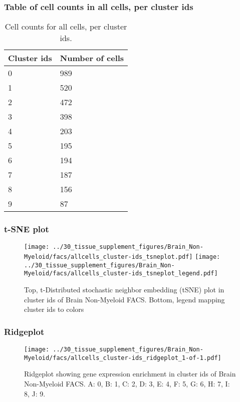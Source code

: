 \subsubsection{Table of cell counts in all cells, per cluster ids}\begin{table}[h]
\centering
\label{my-label}
\begin{tabular}{@{}ll@{}}
\toprule

Cluster ids& Number of cells \\ \midrule
0 & 989 \\

1 & 520 \\

2 & 472 \\

3 & 398 \\

4 & 203 \\

5 & 195 \\

6 & 194 \\

7 & 187 \\

8 & 156 \\

9 & 87 \\
\bottomrule
\end{tabular}
\caption{Cell counts for all cells, per cluster ids.}
\end{table}

\newpage
\subsubsection{t-SNE plot}
\begin{figure}[h]
\centering
\texttt{[image: ../30\_tissue\_supplement\_figures/Brain\_Non-Myeloid/facs/allcells\_cluster-ids\_tsneplot.pdf]}
\texttt{[image: ../30\_tissue\_supplement\_figures/Brain\_Non-Myeloid/facs/allcells\_cluster-ids\_tsneplot\_legend.pdf]}
\caption{Top, t-Distributed stochastic neighbor embedding (tSNE) plot  in cluster ids of Brain Non-Myeloid FACS. Bottom, legend mapping cluster ids to colors}
\end{figure}


\newpage
\newpage
\subsubsection{Ridgeplot}
\begin{figure}[h]
\centering
\texttt{[image: ../30\_tissue\_supplement\_figures/Brain\_Non-Myeloid/facs/allcells\_cluster-ids\_ridgeplot\_1-of-1.pdf]}

\caption{ Ridgeplot  showing gene expression enrichment in cluster ids of Brain Non-Myeloid FACS. A: 0, B: 1, C: 2, D: 3, E: 4, F: 5, G: 6, H: 7, I: 8, J: 9.}
\end{figure}


